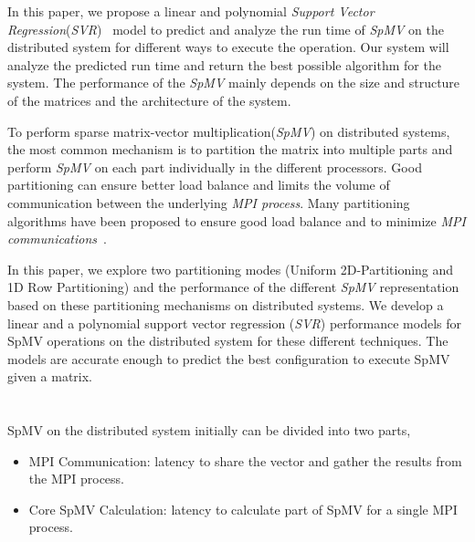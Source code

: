 \documentclass[conference, 10ppt]{IEEEtran}
\begin{document}
In this paper, we propose a linear and polynomial \textit{Support
  Vector Regression}(\textit{SVR})~\cite{awad2015support} model to predict and analyze the
run time of \textit{SpMV} on the distributed system for different ways
to execute the operation. Our system will analyze the predicted run
time and return the best possible algorithm for the system. The
performance of the \textit{SpMV} mainly depends on the size and
structure of the matrices and the architecture of the system. 

To perform sparse matrix-vector multiplication(\textit{SpMV}) on
distributed systems, the most common mechanism is to partition the
matrix into multiple parts and perform \textit{SpMV} on each part
individually in the different processors. Good partitioning can ensure
better load balance and limits the volume of communication between the
underlying \textit{MPI process}. Many partitioning
algorithms have been proposed to ensure good load balance and to
minimize \textit{MPI communications}~\cite{deveci2015hypergraph, karypis1995multilevel,
  kaya2013analysis}.

In this paper, we explore two partitioning modes (Uniform
2D-Partitioning and 1D Row Partitioning) and the performance of the
different \textit{SpMV} representation based on these partitioning
mechanisms on distributed systems. We develop a linear and a
polynomial support vector regression (\textit{SVR}) performance models
for SpMV operations on the distributed system for these different
techniques. The models are accurate enough to predict the best
configuration to execute SpMV given a matrix.


\section{}
SpMV on the distributed system initially can be divided into two parts, 
\begin{itemize}
\item MPI Communication: latency to share the vector and gather the results from the MPI process. 
\item Core SpMV Calculation: latency to calculate part of SpMV for a single MPI process.
\end{itemize}
\end{document}
